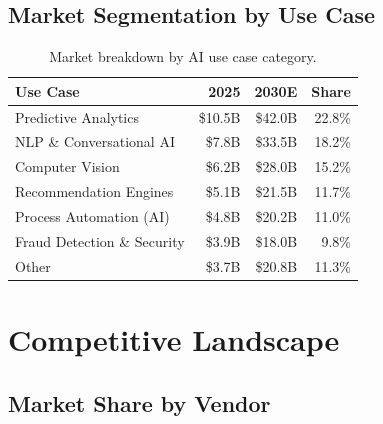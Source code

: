 \documentclass[
    language=english,
    doctype=market-analysis,
    institution=none,
]{../../omnilatex}
\begin{document}
\subsection{Market Segmentation by Use Case}

\begin{table}[h]
    \centering
    \begin{tabular}{lrrr}
        \toprule
        \textbf{Use Case} & \textbf{2025} & \textbf{2030E} & \textbf{Share} \\
        \midrule
        Predictive Analytics      & \$10.5B & \$42.0B & 22.8\% \\
        NLP \& Conversational AI   & \$7.8B  & \$33.5B & 18.2\% \\
        Computer Vision            & \$6.2B  & \$28.0B & 15.2\% \\
        Recommendation Engines     & \$5.1B  & \$21.5B & 11.7\% \\
        Process Automation (AI)    & \$4.8B  & \$20.2B & 11.0\% \\
        Fraud Detection \& Security & \$3.9B & \$18.0B &  9.8\% \\
        Other                      & \$3.7B  & \$20.8B & 11.3\% \\
        \bottomrule
    \end{tabular}
    \caption{Market breakdown by AI use case category.}
\end{table}

\section{Competitive Landscape}

\subsection{Market Share by Vendor}
\end{document}
